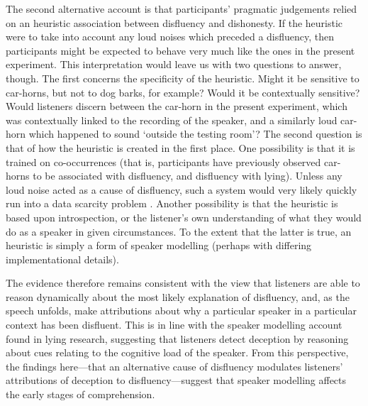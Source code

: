 \documentclass[a4paper,man,natbib]{apa6}
\begin{document}
The second alternative account is that participants' pragmatic judgements relied on an heuristic association between disfluency and dishonesty.
If the heuristic were to take into account any loud noises which preceded a disfluency, then participants might be expected to behave very much like the ones in the present experiment.
This interpretation would leave us with two questions to answer, though.
The first concerns the specificity of the heuristic.
Might it be sensitive to car-horns, but not to dog barks, for example?
Would it be contextually sensitive?
Would listeners discern between the car-horn in the present experiment, which was contextually linked to the recording of the speaker, and a similarly loud car-horn which happened to sound `outside the testing room'?
The second question is that of how the heuristic is created in the first place.
One possibility is that it is trained on co-occurrences (that is, participants have previously observed car-horns to be associated with disfluency, and disfluency with lying).
Unless any loud noise acted as a cause of disfluency, such a system would very likely quickly run into a data scarcity problem \citep[see][for a similar argument concerning parsing]{Mitchell:ea:95}.
Another possibility is that the heuristic is based upon introspection, or the listener's own understanding of what they would do as a speaker in given circumstances.
To the extent that the latter is true, an heuristic is simply a form of speaker modelling (perhaps with differing implementational details).

The evidence therefore remains consistent with the view that listeners are able to reason dynamically about the most likely explanation of disfluency, and, as the speech unfolds, make attributions about why a particular speaker in a particular context has been disfluent.
This is in line with the speaker modelling account found in lying research, suggesting that listeners detect deception by reasoning about cues relating to the cognitive load of the speaker\citep{Zuckerman1981,depaulo2003cues}.
From this perspective, the findings here---that an alternative cause of disfluency modulates listeners' attributions of deception to disfluency---suggest that speaker modelling affects the early stages of comprehension.

\end{document}
